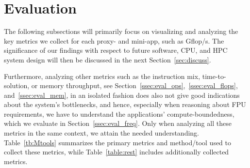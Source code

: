 \section{Evaluation}\label{sec:eval}
%
The following subsections will primarily focus on visualizing and analyzing the key metrics we collect for each proxy- and mini-app,
such as \unit[]{Gflop/s}. The significance of our findings with respect to future software, CPU, and HPC system design will then
be discussed in the next Section~\ref{sec:discuss}.

Furthermore, analyzing other metrics such as the instruction mix, time-to-solution, or memory throughput,
see Section~\ref{ssec:eval_ops},~\ref{ssec:eval_flops}, and~\ref{ssec:eval_mem},
in an isolated fashion does also not give good indications about the system's bottlenecks,
and hence, especially when reasoning about FPU requirements, we have to understand
the applications' compute-boundedness, which we evaluate in Section~\ref{ssec:eval_freq}.
Only when analyzing all these metrics in the same context, we attain the needed understanding.
Table~\ref{tb:Mtools} summarizes the primary metrics and method/tool used to collect these metrics,
while Table~\ref{table:rest} includes additionally collected metrics.
%

